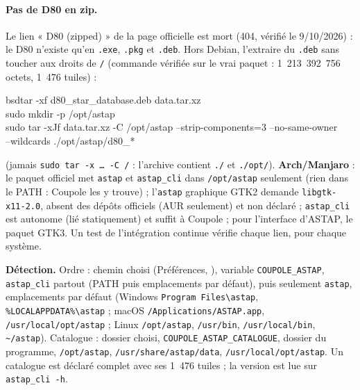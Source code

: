 \paragraph{Pas de D80 en zip.} Le lien « D80 (zipped) » de la page officielle est mort (404, vérifié le 9/10/2026) :
le D80 n'existe qu'en \texttt{.exe}, \texttt{.pkg} et \texttt{.deb}. Hors Debian, l'extraire du \texttt{.deb} sans
toucher aux droits de \texttt{/} (commande vérifiée sur le vrai paquet : 1~213~392~756 octets, 1~476 tuiles) :
\begin{ccode}
bsdtar -xf d80\_star\_database.deb data.tar.xz\\
sudo mkdir -p /opt/astap\\
sudo tar -xJf data.tar.xz -C /opt/astap --strip-components=3 --no-same-owner\\
\hspace*{2em}--wildcards \textquotesingle./opt/astap/d80\_*\textquotesingle
\end{ccode}
(jamais \texttt{sudo tar -x … -C /} : l'archive contient \texttt{./} et \texttt{./opt/}). \textbf{Arch/Manjaro} : le
paquet officiel met \texttt{astap} et \texttt{astap\_cli} dans \texttt{/opt/astap} seulement (rien dans le PATH :
Coupole les y trouve) ; l'\texttt{astap} graphique GTK2 demande \texttt{libgtk-x11-2.0}, absent des dépôts officiels
(AUR seulement) et non déclaré ; \texttt{astap\_cli} est autonome (lié statiquement) et suffit à Coupole ; pour
l'interface d'ASTAP, le paquet GTK3. Un test de l'intégration continue vérifie chaque lien, pour chaque système.

\begin{sloppypar}\noindent\textbf{Détection.} Ordre : chemin choisi (Préférences, ), variable
\texttt{COUPOLE\_ASTAP}, \texttt{astap\_cli} partout (PATH puis emplacements par défaut), puis seulement \texttt{astap}, emplacements par défaut (Windows
\texttt{Program Files\textbackslash astap}, \texttt{\%LOCALAPPDATA\%\textbackslash astap} ; macOS
\texttt{/Applications/ASTAP.app}, \texttt{/usr/local/opt/astap} ; Linux \texttt{/opt/astap}, \texttt{/usr/bin},
\texttt{/usr/local/bin}, \texttt{\textasciitilde/astap}). Catalogue : dossier choisi, \texttt{COUPOLE\_ASTAP\_CATALOGUE},
dossier du programme, \texttt{/opt/astap}, \texttt{/usr/share/astap/data}, \texttt{/usr/local/opt/astap}. Un catalogue
est déclaré complet avec ses 1~476 tuiles ; la version est lue sur \texttt{astap\_cli -h}.\end{sloppypar}


